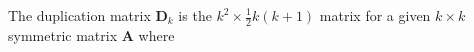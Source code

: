 \noindent The duplication matrix
$
\mathbf{D}_{k}
$
is the 
$
k^2 
\times 
\frac{1}{2}
k 
\left( 
k 
+ 
1 
\right)
$
matrix
for a given
$
k 
\times 
k
$ 
symmetric matrix 
$
\mathbf{A}
$
where
